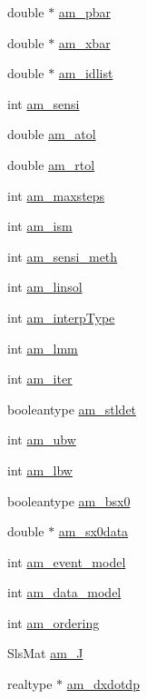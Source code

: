\begin{DoxyCompactItemize}
\item 
double $\ast$ \hyperlink{struct_user_data_aa73d75cc02e28bcdf108cbea53e615e9}{am\+\_\+pbar}
\item 
double $\ast$ \hyperlink{struct_user_data_ad21f2b82715b051daf2775ed059afdbb}{am\+\_\+xbar}
\item 
double $\ast$ \hyperlink{struct_user_data_ab62bd78b1593ddbf3d854356b4dcaa0f}{am\+\_\+idlist}
\item 
int \hyperlink{struct_user_data_a3bd631d595b8a864de83f25a1756ce3d}{am\+\_\+sensi}
\item 
double \hyperlink{struct_user_data_a2aade90998d7e2cefa7953d4fdbc438b}{am\+\_\+atol}
\item 
double \hyperlink{struct_user_data_a2370b78f280747d84a69619ea8c55985}{am\+\_\+rtol}
\item 
int \hyperlink{struct_user_data_a0187950731c16f2857d0cd5b92416352}{am\+\_\+maxsteps}
\item 
int \hyperlink{struct_user_data_a1f2514c0ee00da61ade386173b718a02}{am\+\_\+ism}
\item 
int \hyperlink{struct_user_data_a83bc6716ecf3decb3d963929361fcd6d}{am\+\_\+sensi\+\_\+meth}
\item 
int \hyperlink{struct_user_data_a03fa52449ab4bb9a1a75312fd9064db1}{am\+\_\+linsol}
\item 
int \hyperlink{struct_user_data_a02adc800558b1cdac3fa8bc96e65dbbb}{am\+\_\+interp\+Type}
\item 
int \hyperlink{struct_user_data_a18b6fbc6159783acab9b5f4b106077cd}{am\+\_\+lmm}
\item 
int \hyperlink{struct_user_data_a2e0183eade68209e6835d3199054f0cc}{am\+\_\+iter}
\item 
booleantype \hyperlink{struct_user_data_a7d39c238c319f0164a15744950bfd021}{am\+\_\+stldet}
\item 
int \hyperlink{struct_user_data_a7283826ef630f92bb04052eb79a377e5}{am\+\_\+ubw}
\item 
int \hyperlink{struct_user_data_a0fd271dea83e804c7b1ef82a2b0ab76c}{am\+\_\+lbw}
\item 
booleantype \hyperlink{struct_user_data_a87d2f917b1bea7fea2d5878ccd43c7db}{am\+\_\+bsx0}
\item 
double $\ast$ \hyperlink{struct_user_data_a7ac27602345668b3a2bcabac4c7af733}{am\+\_\+sx0data}
\item 
int \hyperlink{struct_user_data_ace3cae0f78a3365a5fac7d7daa9928ff}{am\+\_\+event\+\_\+model}
\item 
int \hyperlink{struct_user_data_a83373144a2adb9f97cdfca2dfc79ce80}{am\+\_\+data\+\_\+model}
\item 
int \hyperlink{struct_user_data_a260a14e35469f1516b194f4f065a9794}{am\+\_\+ordering}
\item 
Sls\+Mat \hyperlink{struct_user_data_a822be7d2872832008aa0b7c0282b04f6}{am\+\_\+\+J}
\item 
realtype $\ast$ \hyperlink{struct_user_data_a04716137a064f7c6d85c04aeb235b4f0}{am\+\_\+dxdotdp}
\end{DoxyCompactItemize}



